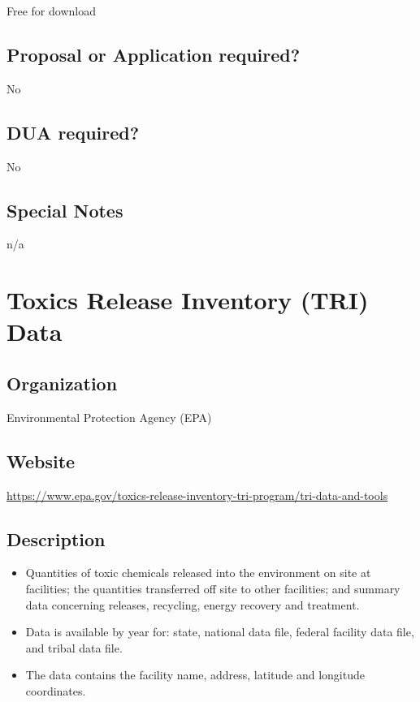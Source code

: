 \documentclass[
]{book}
\providecommand{\tightlist}{%
  \setlength{\itemsep}{0pt}\setlength{\parskip}{0pt}}
\begin{document}
Free for download

\hypertarget{proposal-or-application-required-87}{%
\section{Proposal or Application required?}\label{proposal-or-application-required-87}}

No

\hypertarget{dua-required-87}{%
\section{DUA required?}\label{dua-required-87}}

No

\hypertarget{special-notes-87}{%
\section{Special Notes}\label{special-notes-87}}

n/a

\mainmatter

\hypertarget{toxics-release-inventory-tri-data}{%
\chapter{Toxics Release Inventory (TRI) Data}\label{toxics-release-inventory-tri-data}}

\hypertarget{organization-88}{%
\section{Organization}\label{organization-88}}

Environmental Protection Agency (EPA)

\hypertarget{website-88}{%
\section{Website}\label{website-88}}

\url{https://www.epa.gov/toxics-release-inventory-tri-program/tri-data-and-tools}

\hypertarget{description-88}{%
\section{Description}\label{description-88}}

\begin{itemize}
\tightlist
\item
  Quantities of toxic chemicals released into the environment on site at facilities; the quantities transferred off site to other facilities; and summary data concerning releases, recycling, energy recovery and treatment.
\item
  Data is available by year for: state, national data file, federal facility data file, and tribal data file.
\item
  The data contains the facility name, address, latitude and longitude coordinates.
\end{itemize}
\end{document}
